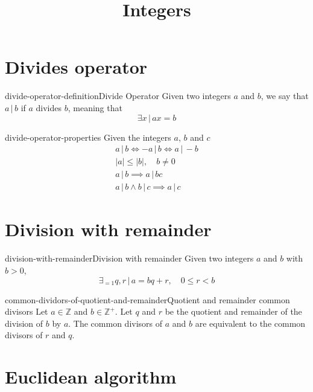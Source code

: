 \documentclass[preview]{standalone}
\newcommand{\divides}{\,|\,}
\begin{document}
\title{Integers}
\genpage

\section{Divides operator}

\begin{snippetdefinition}{divide-operator-definition}{Divide Operator}
    Given two integers \(a\) and \(b\),
    we say that \(a \divides b\) if \(a\) divides \(b\),
    meaning that
    \[
        \exists x \,|\, ax = b
    \]
\end{snippetdefinition}

\begin{snippet}{divide-operator-properties}
Given the integers \(a\), \(b\) and \(c\)
\begin{align*}
    a \divides b \iff -a \divides b \iff a \divides -b \\
    |a| \leq |b|, \quad b \neq 0 \\
    a \divides b \implies a \divides bc \\
    a \divides b \land b \divides c \implies a \divides c
\end{align*}
\end{snippet}

\section{Division with remainder}

\begin{snippetproposition}{division-with-remainder}{Division with remainder}
    Given two integers \(a\) and \(b\) with \(b > 0\),
    \[
        \exists_{=1} q,r \,|\, a=bq+r, \quad 0 \leq r < b
    \]
\end{snippetproposition}


\begin{snippetlemma}{common-dividors-of-quotient-and-remainder}{Quotient and remainder common divisors}
Let \(a \in \mathbb{Z}\) and \(b \in {\mathbb{Z}}^+\).
Let \(q\) and \(r\) be the quotient and remainder of the division of \(b\)
by \(a\).
The common divisors of \(a\) and \(b\) are equivalent to the common divisors of \(r\) and \(q\).
\end{snippetlemma}


\section{Euclidean algorithm}
\end{document}
